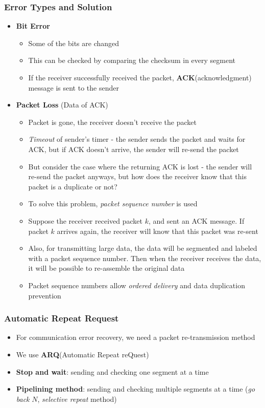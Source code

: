 \subsubsection{Error Types and Solution}
\begin{itemize}
	\item \textbf{Bit Error}
	\begin{itemize}
		\item Some of the bits are changed
		\item This can be checked by comparing the checksum in every segment
		\item If the receiver successfully received the packet, \textbf{ACK}(acknowledgment) message is sent to the sender
	\end{itemize}
	\item \textbf{Packet Loss} (Data of ACK)
	\begin{itemize}
		\item Packet is gone, the receiver doesn't receive the packet
		\item \textit{Timeout} of sender's timer - the sender sends the packet and waits for ACK, but if ACK doesn't arrive, the sender will re-send the packet
		\item But consider the case where the returning ACK is lost - the sender will re-send the packet anyways, but how does the receiver know that this packet is a duplicate or not?
		\item To solve this problem, \textit{packet sequence number} is used
		\item Suppose the receiver received packet $k$, and sent an ACK message. If packet $k$ arrives again, the receiver will know that this packet was re-sent
		\item Also, for transmitting large data, the data will be segmented and labeled with a packet sequence number. Then when the receiver receives the data, it will be possible to re-assemble the original data
		\item Packet sequence numbers allow \textit{ordered delivery} and data duplication prevention
	\end{itemize}
\end{itemize}

\subsubsection{Automatic Repeat Request}
\begin{itemize}
	\item For communication error recovery, we need a packet re-transmission method
	\item We use \textbf{ARQ}(Automatic Repeat reQuest)
	\item \textbf{Stop and wait}: sending and checking one segment at a time
	\item \textbf{Pipelining method}: sending and checking multiple segments at a time (\textit{go back} $N$, \textit{selective repeat} method)
\end{itemize}

